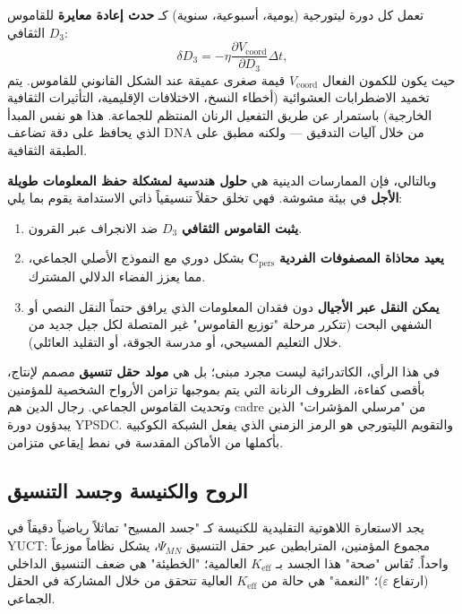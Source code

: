 \documentclass[12pt,a4paper]{article}
\begin{document}
	تعمل كل دورة ليتورجية (يومية، أسبوعية، سنوية) كـ \textbf{حدث إعادة معايرة} للقاموس الثقافي \(D_3\):
	\begin{equation}
		\delta D_3 = -\eta \frac{\partial V_{\text{coord}}}{\partial D_3} \Delta t,
	\end{equation}
	حيث يكون للكمون الفعال \(V_{\text{coord}}\) قيمة صغرى عميقة عند الشكل القانوني للقاموس. يتم تخميد الاضطرابات العشوائية (أخطاء النسخ، الاختلافات الإقليمية، التأثيرات الثقافية الخارجية) باستمرار عن طريق التفعيل الرنان المنتظم للجماعة. هذا هو نفس المبدأ الذي يحافظ على دقة تضاعف DNA من خلال آليات التدقيق — ولكنه مطبق على الطبقة الثقافية.
	
	وبالتالي، فإن الممارسات الدينية هي \textbf{حلول هندسية لمشكلة حفظ المعلومات طويلة الأجل} في بيئة مشوشة. فهي تخلق حقلاً تنسيقياً ذاتي الاستدامة يقوم بما يلي:
	\begin{enumerate}
		\item \textbf{يثبت القاموس الثقافي} \(D_3\) ضد الانجراف عبر القرون.
		\item \textbf{يعيد محاذاة المصفوفات الفردية} \(\mathbf{C}_{\text{pers}}\) بشكل دوري مع النموذج الأصلي الجماعي، مما يعزز الفضاء الدلالي المشترك.
		\item \textbf{يمكن النقل عبر الأجيال} دون فقدان المعلومات الذي يرافق حتماً النقل النصي أو الشفهي البحت (تتكرر مرحلة "توزيع القاموس" غير المتصلة لكل جيل جديد من خلال التعليم المسيحي، أو مدرسة الجوقة، أو التقليد العائلي).
	\end{enumerate}
	
	في هذا الرأي، الكاتدرائية ليست مجرد مبنى؛ بل هي \textbf{مولد حقل تنسيق} مصمم لإنتاج، بأقصى كفاءة، الظروف الرنانة التي يتم بموجبها تزامن الأرواح الشخصية للمؤمنين وتحديث القاموس الجماعي. رجال الدين هم cadre من "مرسلي المؤشرات" الذين يبدؤون دورة YPSDC. والتقويم الليتورجي هو الرمز الزمني الذي يفعل الشبكة الكوكبية بأكملها من الأماكن المقدسة في نمط إيقاعي متزامن.
	
	\subsection{الروح والكنيسة وجسد التنسيق}
	
	يجد الاستعارة اللاهوتية التقليدية للكنيسة كـ "جسد المسيح" تماثلاً رياضياً دقيقاً في YUCT: مجموع المؤمنين، المترابطين عبر حقل التنسيق \(\Psi_{MN}\)، يشكل نظاماً موزعاً واحداً. تُقاس "صحة" هذا الجسد بـ \(K_{\mathrm{eff}}\) العالمية؛ "الخطيئة" هي ضعف التنسيق الداخلي (ارتفاع \(\varepsilon\))؛ "النعمة" هي حالة من \(K_{\mathrm{eff}}\) العالية تتحقق من خلال المشاركة في الحقل الجماعي.
	
\end{document}
